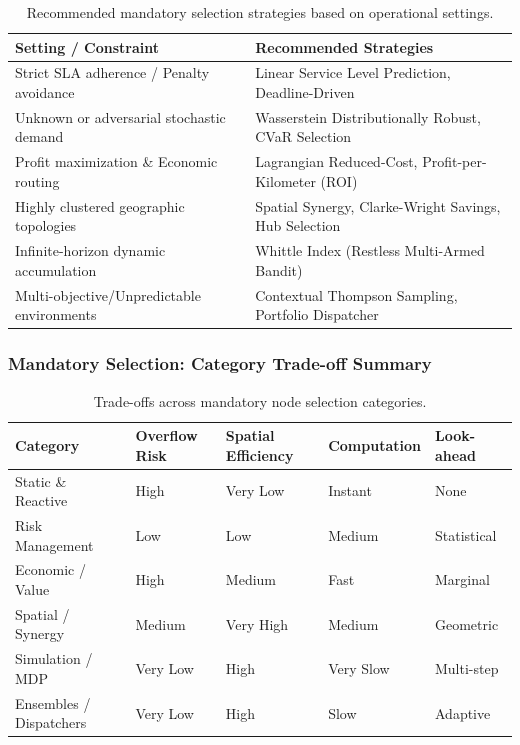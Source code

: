 \documentclass{article}
\begin{document}
\begin{table}[H]
    \centering
    \caption{Recommended mandatory selection strategies based on operational settings.}
    \begin{tabularx}{\textwidth}{@{} l X @{}}
        \toprule
        \textbf{Setting / Constraint} & \textbf{Recommended Strategies} \\
        \midrule
        Strict SLA adherence / Penalty avoidance & Linear Service Level Prediction, Deadline-Driven \\
        Unknown or adversarial stochastic demand & Wasserstein Distributionally Robust, CVaR Selection \\
        Profit maximization \& Economic routing & Lagrangian Reduced-Cost, Profit-per-Kilometer (ROI) \\
        Highly clustered geographic topologies & Spatial Synergy, Clarke-Wright Savings, Hub Selection \\
        Infinite-horizon dynamic accumulation & Whittle Index (Restless Multi-Armed Bandit) \\
        Multi-objective/Unpredictable environments & Contextual Thompson Sampling, Portfolio Dispatcher \\
        \bottomrule
    \end{tabularx}
\end{table}

\subsubsection*{Mandatory Selection: Category Trade-off Summary}

\begin{table}[H]
    \centering
    \caption{Trade-offs across mandatory node selection categories.}
    \begin{tabularx}{\textwidth}{@{} X l l l l @{}}
        \toprule
        \textbf{Category} & \textbf{Overflow Risk} & \textbf{Spatial Efficiency} & \textbf{Computation} & \textbf{Look-ahead} \\
        \midrule
        Static \& Reactive & High & Very Low & Instant & None \\
        Risk Management & Low & Low & Medium & Statistical \\
        Economic / Value & High & Medium & Fast & Marginal \\
        Spatial / Synergy & Medium & Very High & Medium & Geometric \\
        Simulation / MDP & Very Low & High & Very Slow & Multi-step \\
        Ensembles / Dispatchers & Very Low & High & Slow & Adaptive \\
        \bottomrule
    \end{tabularx}
\end{table}
\end{document}

